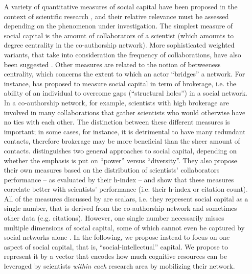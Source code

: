 \documentclass{article}
\begin{document}
A variety of quantitative measures of social capital have been proposed in the context of scientific research \citep{Abbasi2014,Schirone2023}, and their relative relevance must be assessed depending on the phenomenon under investigation. The simplest measure of social capital is the amount of collaborators of a scientist (which amounts to degree centrality in the co-authorship network). More sophisticated weighted variants, that take into consideration the frequency of collaborations, have also been suggested \citep{Abbasi2014}. Other measures are related to the notion of betweeness centrality, which concerns the extent to which an actor ``bridges'' a network. For instance, \citet{BurtBrokerage2007} has proposed to measure social capital in term of brokerage, i.e. the ability of an individual to overcome gaps (``structural holes'') in a social network. In a co-authorship network, for example, scientists with high brokerage are involved in many collaborations that gather scientists who would otherwise have no ties with each other. The distinction between these different measures is important; in some cases, for instance, it is detrimental to have many redundant contacts, therefore brokerage may be more beneficial than the sheer amount of contacts. \citet{Abbasi2014} distinguishes two general approaches to social capital, depending on whether the emphasis is put on ``power'' versus ``diversity''. They also propose their own measures based on the distribution of scientists' collaborators performance -- as evaluated by their h-index -- and show that these measures correlate better with scientists' performance (i.e. their h-index or citation count). All of the measures discussed by \citet{Abbasi2014} are scalars, i.e. they represent social capital as a single number, that is derived from the co-authorship network and sometimes other data (e.g. citations). However, one single number necessarily misses multiple dimensions of social capital, some of which cannot even be captured by social networks alone \citep{MartnAlczar2019}. In the following, we propose instead to focus on one aspect of social capital, that is, ``social-intellectual'' capital. We propose to represent it by a vector that encodes how much cognitive resources can be leveraged by scientists \textit{within each} research area by mobilizing their network.
\end{document}

